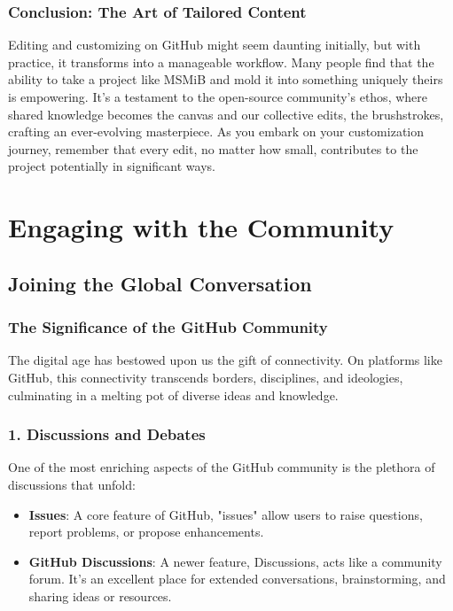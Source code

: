 \documentclass{book}
\begin{document}
\subsection*{Conclusion: The Art of Tailored Content}
Editing and customizing on GitHub might seem daunting initially, but with practice, it transforms into a manageable workflow. Many people find that the ability to take a project like MSMiB and mold it into something uniquely theirs is empowering. It's a testament to the open-source community's ethos, where shared knowledge becomes the canvas and our collective edits, the brushstrokes, crafting an ever-evolving masterpiece. As you embark on your customization journey, remember that every edit, no matter how small, contributes to the project potentially in significant ways.

\chapter{Engaging with the Community}
\section*{Joining the Global Conversation}

\subsection*{The Significance of the GitHub Community}
The digital age has bestowed upon us the gift of connectivity. On platforms like GitHub, this connectivity transcends borders, disciplines, and ideologies, culminating in a melting pot of diverse ideas and knowledge. 

\subsection*{1. Discussions and Debates}
One of the most enriching aspects of the GitHub community is the plethora of discussions that unfold:

\begin{itemize}
    \item \textbf{Issues}: A core feature of GitHub, "issues" allow users to raise questions, report problems, or propose enhancements. 
    \item \textbf{GitHub Discussions}: A newer feature, Discussions, acts like a community forum. It's an excellent place for extended conversations, brainstorming, and sharing ideas or resources.
\end{itemize}
\end{document}
